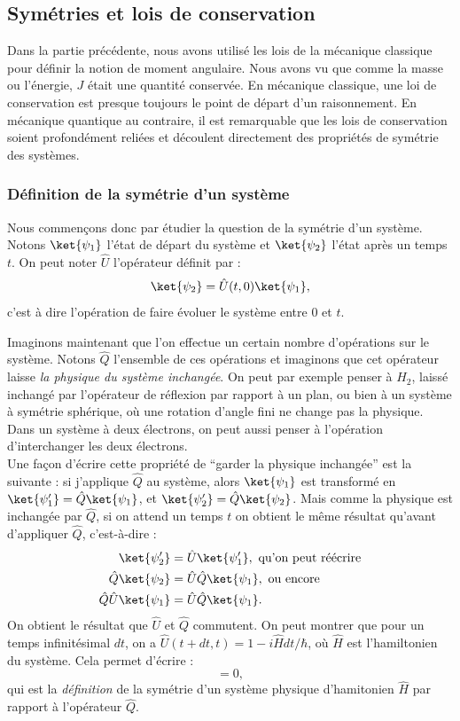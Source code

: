\subsection{Symétries et lois de conservation}

Dans la partie précédente, nous avons utilisé les lois de la mécanique classique pour définir la notion de moment angulaire. Nous avons vu que comme la masse ou l'énergie, $J$ était une quantité conservée. En mécanique classique, une loi de conservation est presque toujours le point de départ d'un raisonnement. En mécanique quantique au contraire, il est remarquable que les lois de conservation soient profondément reliées et découlent directement des propriétés de symétrie des systèmes. 

\subsubsection{Définition de la symétrie d'un système}
Nous commençons donc par étudier la question de la symétrie d'un système. Notons $\ket{\psi_1}$ l'état de départ du système et $\ket{\psi_2}$ l'état après un temps $t$. On peut noter $\hat{U}$ l'opérateur définit par :
\begin{equation*}
\ket{\psi_2}=\hat{U}(t,0)\ket{\psi_1},
\end{equation*}
c'est à dire l'opération de faire évoluer le système entre 0 et $t$.

Imaginons maintenant que l'on effectue un certain nombre d'opérations sur le système. Notons $\hat{Q}$ l'ensemble de ces opérations et imaginons que cet opérateur laisse \textit{la physique du système inchangée}. On peut par exemple penser à $H_2$, laissé inchangé par l'opérateur de réflexion par rapport à un plan, ou bien à un système à symétrie sphérique, où une rotation d'angle fini ne change pas la physique. Dans un système à deux électrons, on peut aussi penser à l'opération d'interchanger les deux électrons. \\
Une façon d'écrire cette propriété de ``garder la physique inchangée'' est la suivante : si j'applique $\hat{Q}$ au système, alors $\ket{\psi_1}$ est transformé en $\ket{\psi'_1}=\hat{Q}\ket{\psi_1}$, et $\ket{\psi'_2}=\hat{Q}\ket{\psi_2}$. Mais comme la physique est inchangée par $\hat{Q}$, si on attend un temps $t$ on obtient le même résultat qu'avant d'appliquer $\hat{Q}$, c'est-à-dire :
\begin{align*}
\ket{\psi'_2}&=\hat{U}\ket{\psi'_1}, \mbox{ qu'on peut réécrire}\\
\hat{Q}\ket{\psi_2}&=\hat{U}\hat{Q}\ket{\psi_1}, \mbox{ ou encore}\\
\hat{Q}\hat{U}\ket{\psi_1}&=\hat{U}\hat{Q}\ket{\psi_1}.
\end{align*}
On obtient le résultat que $\hat{U}$ et $\hat{Q}$ commutent. On peut montrer que pour un temps infinitésimal $dt$, on a $\hat{U}(t+dt,t) = 1-i\hat{H}dt/\hbar$, où $\hat{H}$ est l'hamiltonien du système. Cela permet d'écrire :
\begin{equation*}
[\hat{H},\hat{Q}]=0,
\end{equation*}
qui est la \textit{définition} de la symétrie d'un système physique d'hamitonien $\hat{H}$ par rapport à l'opérateur $\hat{Q}$.


